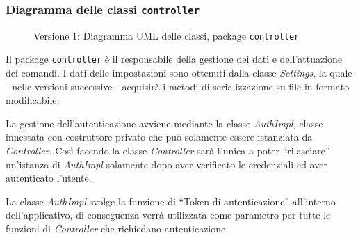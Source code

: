 \subsubsection{Diagramma delle classi \texttt{controller}}
\vspace{0.5cm}
\begin{figure}[H]
    \centering
    \caption{Versione 1: Diagramma UML delle classi, package \texttt{controller}}
    \label{fig:class_controller_v_1}
\end{figure}

Il package \texttt{controller} è il responsabile della gestione dei dati e dell'attuazione dei comandi.
I dati delle impostazioni sono ottenuti dalla classe \textit{Settings}, la quale - nelle versioni successive -
acquisirà i metodi di serializzazione su file in formato modificabile. 

La gestione dell'autenticazione avviene mediante la classe \textit{AuthImpl}, classe innestata con costruttore privato
che può solamente essere istanziata da \textit{Controller}.
Così facendo la classe \textit{Controller} sarà l'unica a poter ``rilasciare'' un'istanza di \textit{AuthImpl} 
solamente dopo aver verificato le credenziali ed aver autenticato l'utente.

La classe \textit{AuthImpl} svolge la funzione di ``Token di autenticazione'' all'interno dell'applicativo, 
di conseguenza verrà utilizzata come parametro per tutte le funzioni di \textit{Controller} che richiedano autenticazione.
